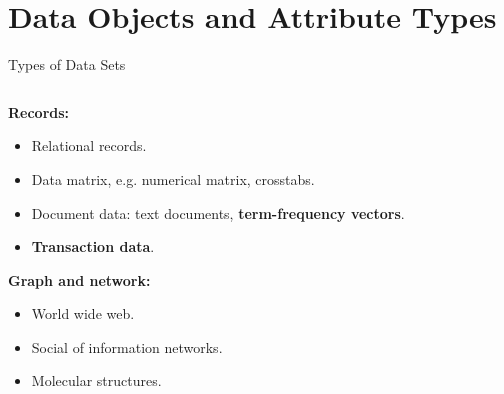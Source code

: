 \section{Data Objects and Attribute Types}

\begin{frame}{Types of Data Sets}
  \begin{columns}
    \begin{column}{0.45\textwidth}
      \textbf{Records:}
      \begin{itemize}[noitemsep]
      \item Relational records.
      \item Data matrix, e.g. numerical matrix, crosstabs.
      \item Document data: text documents, \textbf{term-frequency vectors}. 
      \item \textbf{Transaction data}. 
      \end{itemize}
      \textbf{Graph and network:}
      \begin{itemize}[noitemsep]
      \item World wide web.
      \item Social of information networks.
      \item Molecular structures.
      \end{itemize}
    \end{column}


\end{columns}
\end{frame}
